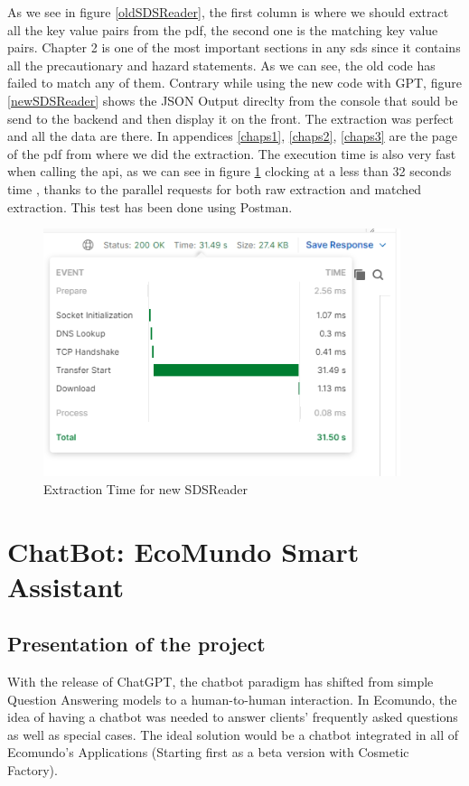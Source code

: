 \documentclass[a4paper,12pt,twoside]{report}
\begin{document}
As we see in figure \ref{oldSDSReader}, the first column is where we should extract all the key value pairs from the pdf, the second one is the matching key value pairs. Chapter 2 is one of the most important sections in any sds since it contains all the precautionary and hazard statements. As we can see, the old code has failed to match any of them.
Contrary while using the new code with GPT, figure \ref{newSDSReader} shows the JSON Output direclty from the console that sould be send to the backend and then display it on the front. The extraction was perfect and all the data are there. In appendices \ref{chaps1}, \ref{chaps2}, \ref{chaps3} are the page of the pdf from where we did the extraction.
The execution time is also very fast when calling the api, as we can see in figure \ref{sdsTimeResponse} clocking at a less than 32 seconds time , thanks to the parallel requests for both raw extraction and matched extraction. This test has been done using Postman.
\begin{figure}[H]
		\includegraphics[width=\textwidth, keepaspectratio ]{images/sdsTimeResponse}
	\caption[Extraction Time for new SDSReader]{Extraction Time for new SDSReader}
\label{sdsTimeResponse}
\end{figure}	

\section{ChatBot: EcoMundo Smart Assistant}\label{chatbot}
\subsection{Presentation of the project}
With the release of ChatGPT, the chatbot paradigm has shifted from simple Question Answering models to a human-to-human interaction. 
In Ecomundo, the idea of having a chatbot was needed to answer clients' frequently asked questions as well as special cases. The ideal solution would be a chatbot integrated in all of Ecomundo's Applications (Starting first as a beta version with Cosmetic Factory).
\end{document}
